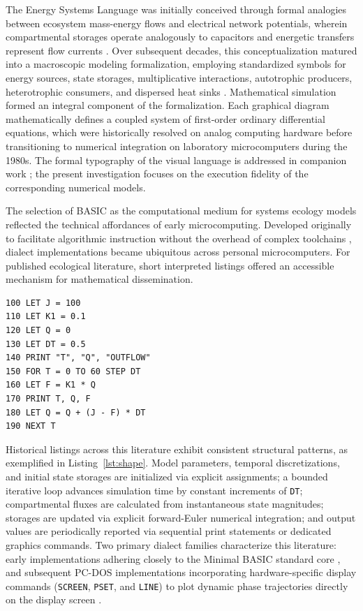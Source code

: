 \documentclass[11pt,a4paper]{article}
\begin{document}
The Energy Systems Language was initially conceived through formal analogies between ecosystem mass-energy flows and electrical network potentials, wherein compartmental storages operate analogously to capacitors and energetic transfers represent flow currents \citep{odum1960}. Over subsequent decades, this conceptualization matured into a macroscopic modeling formalization, employing standardized symbols for energy sources, state storages, multiplicative interactions, autotrophic producers, heterotrophic consumers, and dispersed heat sinks \citep{odum1972,odum1983,odum1994}. Mathematical simulation formed an integral component of the formalization. Each graphical diagram mathematically defines a coupled system of first-order ordinary differential equations, which were historically resolved on analog computing hardware before transitioning to numerical integration on laboratory microcomputers during the 1980s. The formal typography of the visual language is addressed in companion work \citep{energese}; the present investigation focuses on the execution fidelity of the corresponding numerical models.

The selection of BASIC as the computational medium for systems ecology models reflected the technical affordances of early microcomputing. Developed originally to facilitate algorithmic instruction without the overhead of complex toolchains \citep{kemenyKurtz1964}, dialect implementations became ubiquitous across personal microcomputers. For published ecological literature, short interpreted listings offered an accessible mechanism for mathematical dissemination. 

\begin{lstlisting}[caption={Representative structural syntax of an ecological simulation listing, illustrating state initialization, forward-Euler numerical integration, and sequential state output.},label={lst:shape}]
100 LET J = 100
110 LET K1 = 0.1
120 LET Q = 0
130 LET DT = 0.5
140 PRINT "T", "Q", "OUTFLOW"
150 FOR T = 0 TO 60 STEP DT
160 LET F = K1 * Q
170 PRINT T, Q, F
180 LET Q = Q + (J - F) * DT
190 NEXT T
\end{lstlisting}

Historical listings across this literature exhibit consistent structural patterns, as exemplified in Listing~\ref{lst:shape}. Model parameters, temporal discretizations, and initial state storages are initialized via explicit assignments; a bounded iterative loop advances simulation time by constant increments of \texttt{DT}; compartmental fluxes are calculated from instantaneous state magnitudes; storages are updated via explicit forward-Euler numerical integration; and output values are periodically reported via sequential print statements or dedicated graphics commands. Two primary dialect families characterize this literature: early implementations adhering closely to the Minimal BASIC standard core \citep{ecma55}, and subsequent PC-DOS implementations incorporating hardware-specific display commands (\texttt{SCREEN}, \texttt{PSET}, and \texttt{LINE}) to plot dynamic phase trajectories directly on the display screen \citep{odum1989}.
\end{document}
